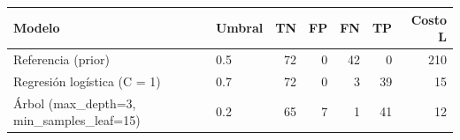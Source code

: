 \begin{tabular}{llrrrrr}
\toprule
Modelo & Umbral & TN & FP & FN & TP & Costo L \\
\midrule
Referencia (prior) & 0.5 & 72 & 0 & 42 & 0 & 210 \\
Regresión logística (C = 1) & 0.7 & 72 & 0 & 3 & 39 & 15 \\
Árbol (max\_depth=3, min\_samples\_leaf=15) & 0.2 & 65 & 7 & 1 & 41 & 12 \\
\bottomrule
\end{tabular}
